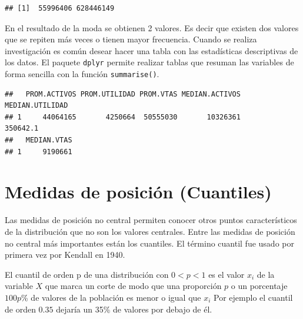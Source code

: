 \documentclass[]{book}
\newenvironment{Shaded}{\begin{snugshade}}{\end{snugshade}}
\newcommand{\KeywordTok}[1]{\textcolor[rgb]{0.13,0.29,0.53}{\textbf{#1}}}
\newcommand{\DataTypeTok}[1]{\textcolor[rgb]{0.13,0.29,0.53}{#1}}
\newcommand{\StringTok}[1]{\textcolor[rgb]{0.31,0.60,0.02}{#1}}
\newcommand{\OperatorTok}[1]{\textcolor[rgb]{0.81,0.36,0.00}{\textbf{#1}}}
\newcommand{\NormalTok}[1]{#1}
\begin{document}
\begin{verbatim}
## [1]  55996406 628446149
\end{verbatim}

En el resultado de la moda se obtienen 2 valores. Es decir que existen
dos valores que se repiten más veces o tienen mayor frecuencia. Cuando
se realiza investigación es común desear hacer una tabla con las
estadísticas descriptivas de los datos. El paquete \texttt{dplyr}
permite realizar tablas que resuman las variables de forma sencilla con
la función \texttt{summarise()}.

\begin{Shaded}
\end{Shaded}

\begin{verbatim}
##   PROM.ACTIVOS PROM.UTILIDAD PROM.VTAS MEDIAN.ACTIVOS MEDIAN.UTILIDAD
## 1     44064165       4250664  50555030       10326361        350642.1
##   MEDIAN.VTAS
## 1     9190661
\end{verbatim}

\section{Medidas de posición
(Cuantiles)}\label{medidas-de-posicion-cuantiles}

Las medidas de posición no central permiten conocer otros puntos
característicos de la distribución que no son los valores centrales.
Entre las medidas de posición no central más importantes están los
cuantiles. El término cuantil fue usado por primera vez por Kendall en
1940.

El cuantil de orden p de una distribución con \(0<p<1\) es el valor
\(x_{i}\) de la variable \(X\) que marca un corte de modo que una
proporción \(p\) o un porcentaje \(100p\)\% de valores de la población
es menor o igual que \(x_{i}\) Por ejemplo el cuantil de orden \(0.35\)
dejaría un 35\% de valores por debajo de él.
\end{document}
